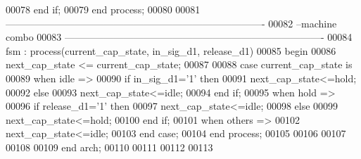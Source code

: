 \begin{DoxyCode}
00078     \textcolor{keywordflow}{end} \textcolor{keywordflow}{if}; 
00079 \textcolor{keywordflow}{end} \textcolor{keywordflow}{process};
00080 
00081 \textcolor{keyword}{-------------------------------------------------------------------------------}
00082 \textcolor{keyword}{--machine combo}
00083 \textcolor{keyword}{-------------------------------------------------------------------------------}
00084 fsm : \textcolor{keywordflow}{process}(current\_cap\_state, in\_sig\_d1, release\_d1) 
00085 \textcolor{vhdlkeyword}{begin}
00086     \textcolor{vhdlchar}{next\_cap\_state} \textcolor{vhdlchar}{<=} \textcolor{vhdlchar}{current\_cap\_state};
00087     
00088     \textcolor{keywordflow}{case} \textcolor{vhdlchar}{current\_cap\_state} \textcolor{keywordflow}{is}
00089       \textcolor{keywordflow}{when} \textcolor{vhdlchar}{idle} \textcolor{vhdlchar}{=}\textcolor{vhdlchar}{>}
00090             \textcolor{keywordflow}{if} \textcolor{vhdlchar}{in\_sig\_d1}\textcolor{vhdlchar}{=}\textcolor{vhdlchar}{'}\textcolor{vhdllogic}{}\textcolor{vhdllogic}{1}\textcolor{vhdlchar}{'} \textcolor{keywordflow}{then} 
00091                 \textcolor{vhdlchar}{next\_cap\_state}\textcolor{vhdlchar}{<=}\textcolor{vhdlchar}{hold};
00092             \textcolor{keywordflow}{else}
00093                 \textcolor{vhdlchar}{next\_cap\_state}\textcolor{vhdlchar}{<=}\textcolor{vhdlchar}{idle};
00094             \textcolor{keywordflow}{end} \textcolor{keywordflow}{if};
00095         \textcolor{keywordflow}{when} \textcolor{vhdlchar}{hold} \textcolor{vhdlchar}{=}\textcolor{vhdlchar}{>} 
00096             \textcolor{keywordflow}{if} \textcolor{vhdlchar}{release\_d1}\textcolor{vhdlchar}{=}\textcolor{vhdlchar}{'}\textcolor{vhdllogic}{}\textcolor{vhdllogic}{1}\textcolor{vhdlchar}{'} \textcolor{keywordflow}{then} 
00097                 \textcolor{vhdlchar}{next\_cap\_state}\textcolor{vhdlchar}{<=}\textcolor{vhdlchar}{idle};
00098             \textcolor{keywordflow}{else}
00099                 \textcolor{vhdlchar}{next\_cap\_state}\textcolor{vhdlchar}{<=}\textcolor{vhdlchar}{hold};
00100             \textcolor{keywordflow}{end} \textcolor{keywordflow}{if};
00101         \textcolor{keywordflow}{when} \textcolor{keywordflow}{others} \textcolor{vhdlchar}{=}\textcolor{vhdlchar}{>} 
00102             \textcolor{vhdlchar}{next\_cap\_state}\textcolor{vhdlchar}{<=}\textcolor{vhdlchar}{idle};
00103     \textcolor{keywordflow}{end} \textcolor{keywordflow}{case};
00104 \textcolor{keywordflow}{end} \textcolor{keywordflow}{process}; 
00105      
00106      
00107      
00108   
00109 \textcolor{keywordflow}{end} \textcolor{vhdlchar}{arch};   
00110 
00111 
00112 
00113 
\end{DoxyCode}
